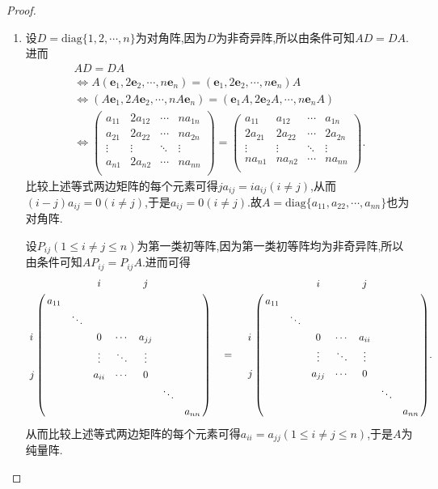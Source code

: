 \documentclass[lang=cn,newtx,10pt,scheme=chinese]{elegantbook}
\begin{document}
\begin{proof}
\begin{enumerate}
\item 设\(D=\text{diag}\{1,2,\cdots,n\}\)为对角阵,因为$D$为非奇异阵,所以由条件可知\(AD = DA\).进而
\begin{gather*}
AD=DA
\\
\Leftrightarrow A\left( \boldsymbol{e}_1,2\boldsymbol{e}_2,\cdots ,n\boldsymbol{e}_n \right) =\left( \boldsymbol{e}_1,2\boldsymbol{e}_2,\cdots ,n\boldsymbol{e}_n \right) A
\\
\Leftrightarrow \left( A\boldsymbol{e}_1,2A\boldsymbol{e}_2,\cdots ,nA\boldsymbol{e}_n \right) =\left( \boldsymbol{e}_1A,2\boldsymbol{e}_2A,\cdots ,n\boldsymbol{e}_nA \right) 
\\
\Leftrightarrow \left( \begin{matrix}
a_{11}&		2a_{12}&		\cdots&		na_{1n}\\
a_{21}&		2a_{22}&		\cdots&		na_{2n}\\
\vdots&		\vdots&		\ddots&		\vdots\\
a_{n1}&		2a_{n2}&		\cdots&		na_{nn}\\
\end{matrix} \right) =\left( \begin{matrix}
a_{11}&		a_{12}&		\cdots&		a_{1n}\\
2a_{21}&		2a_{22}&		\cdots&		2a_{2n}\\
\vdots&		\vdots&		\ddots&		\vdots\\
na_{n1}&		na_{n2}&		\cdots&		na_{nn}\\
\end{matrix} \right).
\end{gather*}
比较上述等式两边矩阵的每个元素可得$ja_{ij}=ia_{ij}\left( i\ne j \right)$,从而$\left( i-j \right) a_{ij}=0\left( i\ne j \right)$,于是$a_{ij}=0\left( i\ne j \right) $.故\(A=\text{diag}\{a_{11},a_{22},\cdots,a_{nn}\}\)也为对角阵.

设\(P_{ij}(1\leq i\neq j\leq n)\)为第一类初等阵,因为第一类初等阵均为非奇异阵,所以由条件可知\(AP_{ij}=P_{ij}A\).进而可得
\begin{align*}
\bordermatrix{%
&    &		&		i&		&		j&		&		\cr
&    a_{11}&		&		&		&		&		&		\cr
&    &		\ddots&		&		&		&		&		\cr
i&    &		&		0&		\cdots&		a_{jj}&		&		\cr
&   &		&		\vdots&		\ddots&		\vdots&		&		\cr
j&    &		&		a_{ii}&		\cdots&		0&		&		\cr
&    &		&		&		&		&		\ddots&		\cr
&    &		&		&		&		&		&		a_{nn}\cr
} \quad =\quad \bordermatrix{%
&    &		&		i&		&		j&		&		\cr
&    a_{11}&		&		&		&		&		&		\cr
&    &		\ddots&		&		&		&		&		\cr
i&    &		&		0&		\cdots&		a_{ii}&		&		\cr
&    &		&		\vdots&		\ddots&		\vdots&		&		\cr
j&   &		&		a_{jj}&		\cdots&		0&		&		\cr
&    &		&		&		&		&		\ddots&		\cr
&    &		&		&		&		&		&		a_{nn}\cr
} .
\end{align*}
从而比较上述等式两边矩阵的每个元素可得\(a_{ii}=a_{jj}(1\leq i\neq j\leq n)\),于是\(A\)为纯量阵.


\end{enumerate}
\end{proof}
\end{document}

